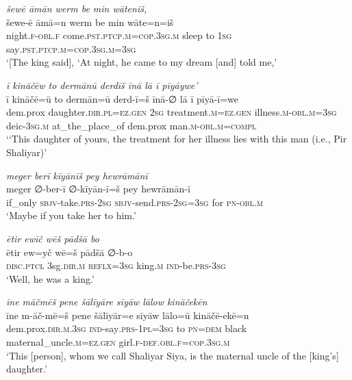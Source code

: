 \ea \label{ZP.32}
\textit{šewē āmān werm be min wāteniš,} \\ 
\gll šewe-ē āmā=n werm be min wāte=n=iš \\ 
 night\textsc{.f}\textsc{-obl}\textsc{.f} come\textsc{.pst}\textsc{.ptcp}\textsc{.m}\textsc{=cop}\textsc{.3sg}\textsc{.m} sleep to \textsc{1sg} say\textsc{.pst}\textsc{.ptcp}\textsc{.m}\textsc{=cop}\textsc{.3sg}\textsc{.m}\textsc{=3sg} \\ 
\glt `[The king said], ‘At night, he came to my dream [and] told me,'
\z 
 
\ea \label{ZP.33}
\textit{ī kināčēw to dermānū derdīš īnā lā ī pīyāywe’} \\ 
\gll ī kināčē=ū to dermān=ū derd-ī=š īnā-∅ lā ī pīyā-ī=we \\ 
 dem.prox daughter\textsc{.dir}\textsc{.pl}\textsc{\textsc{=ez.gen}} \textsc{2sg} treatment\textsc{.m}\textsc{\textsc{=ez.gen}} illness\textsc{.m}\textsc{-obl}\textsc{.m}\textsc{=3sg} deic\textsc{-3sg}\textsc{.m} at\_the\_place\_of dem.prox man\textsc{.m}\textsc{-obl}\textsc{.m}\textsc{=compl} \\ 
\glt `‘This daughter of yours, the treatment for her illness lies with this man (i.e., Pir Shaliyar)'
\z 
 
\ea \label{ZP.34}
\textit{meger berī kīyānīš pey hewrāmānī} \\ 
\gll meger ∅-ber-ī ∅-kīyān-ī=š pey hewrāmān-ī \\ 
 if\_only \textsc{sbjv-}take\textsc{.prs}-\textsc{2sg} \textsc{sbjv-}send\textsc{.prs}-\textsc{2sg}\textsc{=3sg} for \textsc{pn}\textsc{-obl}\textsc{.m} \\ 
\glt `Maybe if you take her to him.'
\z 
 
\ea \label{ZP.35}
\textit{ētir ewīč wēš pādšā bo} \\ 
\gll ētir ew=yč wē=š pādšā ∅-b-o \\ 
 \textsc{disc.ptcl} 3sg\textsc{.dir}\textsc{.m} \textsc{reflx}\textsc{=3sg} king\textsc{.m} \textsc{ind-}be\textsc{.prs}\textsc{-3sg} \\ 
\glt `Well, he was a king.'
\z 
 
\ea \label{ZP.36}
\textit{īne māčmēš pene šālīyāre sīyāw lālow kināčekēn} \\ 
\gll īne m-āč-mē=š pene šālīyār=e sīyāw lālo=ū kināčē-ekē=n \\ 
 dem.prox\textsc{.dir}\textsc{.m}\textsc{.3sg} \textsc{ind-}say\textsc{.prs}\textsc{-1pl}\textsc{=3sg} to \textsc{pn}\textsc{=dem} black maternal\_uncle\textsc{.m}\textsc{\textsc{=ez.gen}} girl\textsc{.f}\textsc{-def}\textsc{.obl}\textsc{.f}\textsc{=cop}\textsc{.3sg}\textsc{.m} \\ 
\glt `This [person], whom we call Shaliyar Siya, is the maternal uncle of the [king’s] daughter.'
\z 
 
